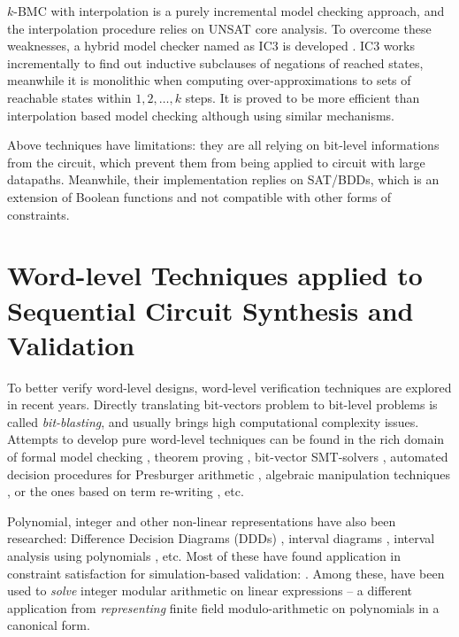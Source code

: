$k$-BMC with interpolation is a purely incremental model checking approach, and the interpolation procedure relies
on UNSAT core analysis. To overcome these weaknesses, a hybrid model checker named as IC3 is developed 
\cite{bradley2011sat} \cite{bradley2011incremental}. IC3 works incrementally to find out inductive subclauses
of negations of reached states, meanwhile it is monolithic when computing over-approximations to sets of reachable
states within $1,2,\dots,k$ steps. It is proved to be more efficient than interpolation based model checking
although using similar mechanisms.

Above techniques have limitations: they are all relying on bit-level informations from 
the circuit, which prevent them from being applied to circuit with large datapaths.
Meanwhile, their implementation replies on SAT/BDDs, which is an extension of Boolean 
functions and not compatible with other forms of constraints.

\section{Word-level Techniques applied to Sequential Circuit Synthesis and Validation}
To better verify word-level designs, word-level verification techniques are 
explored in recent years. Directly translating bit-vectors problem to bit-level 
problems is called {\it bit-blasting}, and usually brings high computational complexity issues.
Attempts to develop pure word-level techniques can be found in
the rich domain of formal model checking \cite{BHEL96} \cite{SMV},
theorem proving \cite{arditi:bmd}, bit-vector SMT-solvers
\cite{boolector} \cite{cvc3} \cite{z3} \cite{bitvector98}, automated
decision procedures for Presburger arithmetic \cite{presburger}
\cite{bultan:mixed_verification}, algebraic manipulation techniques 
\cite{devadas:algebraic_manipulation_iccd91}, or the ones based on
term re-writing \cite{AST}, etc. %

Polynomial, integer and other non-linear representations have also
been researched: Difference Decision Diagrams (DDDs) \cite{ddd-csl99} \cite{ddd-mt-98}, interval
diagrams \cite{interval_dd}, interval analysis using polynomials
\cite{polynomial_sanchez99}, etc. Most of these have found 
application in constraint satisfaction for simulation-based
validation:  \cite{Ritter99} \cite{hsat} \cite{lpsat}
\cite{brinkmann:asp-dac} \cite{Huang:tcad01} \cite{bitvector98}. Among
these, \cite{brinkmann:asp-dac} \cite{Huang:tcad01} \cite{bitvector98}
have been used to {\it solve} integer modular arithmetic on linear
expressions -- a different application from {\it representing}
finite field modulo-arithmetic on polynomials in a canonical form.   

